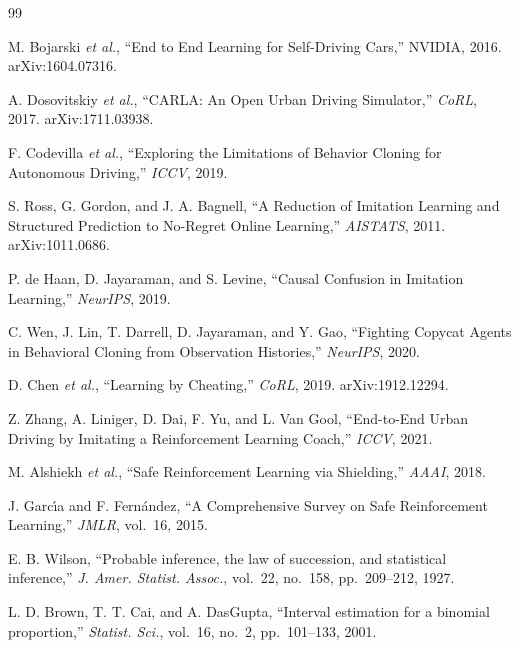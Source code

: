 \documentclass[conference]{IEEEtran}
\begin{document}
\begin{thebibliography}{99}
\footnotesize
\setlength{\itemsep}{0pt}\setlength{\parsep}{0pt}

 M. Bojarski \textit{et al.}, ``End to End Learning
for Self-Driving Cars,'' NVIDIA, 2016. arXiv:1604.07316.

 A. Dosovitskiy \textit{et al.}, ``CARLA: An Open Urban
Driving Simulator,'' \emph{CoRL}, 2017. arXiv:1711.03938.

 F. Codevilla \textit{et al.}, ``Exploring the
Limitations of Behavior Cloning for Autonomous Driving,'' \emph{ICCV},
2019.

 S. Ross, G. Gordon, and J. A. Bagnell, ``A Reduction of
Imitation Learning and Structured Prediction to No-Regret Online
Learning,'' \emph{AISTATS}, 2011. arXiv:1011.0686.

 P. de Haan, D. Jayaraman, and S. Levine, ``Causal
Confusion in Imitation Learning,'' \emph{NeurIPS}, 2019.

 C. Wen, J. Lin, T. Darrell, D. Jayaraman, and Y. Gao,
``Fighting Copycat Agents in Behavioral Cloning from Observation
Histories,'' \emph{NeurIPS}, 2020.

 D. Chen \textit{et al.}, ``Learning by Cheating,''
\emph{CoRL}, 2019. arXiv:1912.12294.

 Z. Zhang, A. Liniger, D. Dai, F. Yu, and L. Van Gool,
``End-to-End Urban Driving by Imitating a Reinforcement Learning
Coach,'' \emph{ICCV}, 2021.

 M. Alshiekh \textit{et al.}, ``Safe Reinforcement
Learning via Shielding,'' \emph{AAAI}, 2018.

 J. Garc\'{\i}a and F. Fern\'andez, ``A Comprehensive
Survey on Safe Reinforcement Learning,'' \emph{JMLR}, vol.~16, 2015.

 E. B. Wilson, ``Probable inference, the law of
succession, and statistical inference,'' \emph{J. Amer. Statist. Assoc.},
vol.~22, no.~158, pp.~209--212, 1927.

 L. D. Brown, T. T. Cai, and A. DasGupta, ``Interval
estimation for a binomial proportion,'' \emph{Statist. Sci.}, vol.~16,
no.~2, pp.~101--133, 2001.

\end{thebibliography}
\end{document}
